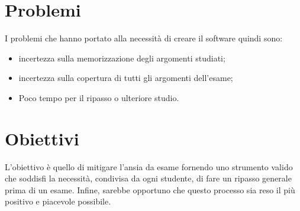 \section{Problemi}
I problemi che hanno portato alla necessità di creare il software quindi sono: 
    \begin{itemize}
        \item incertezza sulla memorizzazione degli argomenti studiati;
        \item incertezza sulla copertura di tutti gli argomenti dell'esame;
        \item Poco tempo per il ripasso o ulteriore studio.
    \end{itemize}
 

\section{Obiettivi}
L'obiettivo è quello di mitigare l'ansia da esame fornendo uno strumento valido che soddisfi la necessità, condivisa da ogni studente, di fare un ripasso generale prima di un esame.
Infine, sarebbe opportuno che questo processo sia reso il più positivo e piacevole possibile.

